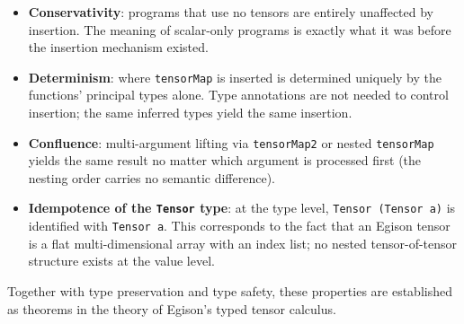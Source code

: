 \begin{itemize}
\item \textbf{Conservativity}: programs that use no tensors are entirely unaffected by insertion.
The meaning of scalar-only programs is exactly what it was before the insertion mechanism existed.
\item \textbf{Determinism}: where \lstinline{tensorMap} is inserted is determined uniquely by the functions' principal types alone.
Type annotations are not needed to control insertion; the same inferred types yield the same insertion.
\item \textbf{Confluence}: multi-argument lifting via \lstinline{tensorMap2} or nested \lstinline{tensorMap} yields the same result no matter which argument is processed first (the nesting order carries no semantic difference).
\item \textbf{Idempotence of the \lstinline{Tensor} type}: at the type level, \lstinline{Tensor (Tensor a)} is identified with \lstinline{Tensor a}.
This corresponds to the fact that an Egison tensor is a flat multi-dimensional array with an index list; no nested tensor-of-tensor structure exists at the value level.
\end{itemize}

Together with type preservation and type safety, these properties are established as theorems in the theory of Egison's typed tensor calculus.
